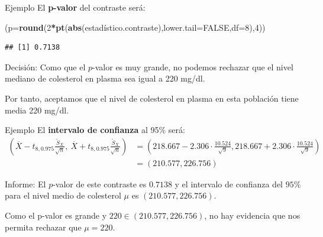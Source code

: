 \documentclass[
  ignorenonframetext,
]{beamer}
\newenvironment{Shaded}{\begin{snugshade}}{\end{snugshade}}
\newcommand{\DataTypeTok}[1]{\textcolor[rgb]{0.13,0.29,0.53}{#1}}
\newcommand{\DecValTok}[1]{\textcolor[rgb]{0.00,0.00,0.81}{#1}}
\newcommand{\KeywordTok}[1]{\textcolor[rgb]{0.13,0.29,0.53}{\textbf{#1}}}
\newcommand{\NormalTok}[1]{#1}
\newcommand{\OperatorTok}[1]{\textcolor[rgb]{0.81,0.36,0.00}{\textbf{#1}}}
\newcommand{\OtherTok}[1]{\textcolor[rgb]{0.56,0.35,0.01}{#1}}
\begin{document}
\begin{frame}[fragile]{Ejemplo}
\protect\hypertarget{ejemplo-12}{}
El \textbf{p-valor} del contraste será:

\begin{Shaded}
\begin{Highlighting}[]
\NormalTok{(}\DataTypeTok{p=}\KeywordTok{round}\NormalTok{(}\DecValTok{2}\OperatorTok{*}\KeywordTok{pt}\NormalTok{(}\KeywordTok{abs}\NormalTok{(estadístico.contraste),}\DataTypeTok{lower.tail=}\OtherTok{FALSE}\NormalTok{,}\DataTypeTok{df=}\DecValTok{8}\NormalTok{),}\DecValTok{4}\NormalTok{))}
\end{Highlighting}
\end{Shaded}

\begin{verbatim}
## [1] 0.7138
\end{verbatim}

Decisión: Como que el \(p\)-valor es muy grande, no podemos rechazar que
el nivel mediano de colesterol en plasma sea igual a 220 mg/dl.

Por tanto, aceptamos que el nivel de colesterol en plasma en esta
población tiene media 220 mg/dl.
\end{frame}

\begin{frame}{Ejemplo}
\protect\hypertarget{ejemplo-13}{}
El \textbf{intervalo de confianza} al 95\% será: \[
\begin{array}{rl}
\left(\overline{X}-t_{8,0.975}\frac{\widetilde{S}_X}{\sqrt{n}},\ \overline{X}+t_{8,0.975}\frac{\widetilde{S}_X}{\sqrt{n}}\right) & =\left(218.667-2.306\cdot \frac{10.524}{\sqrt{9}},218.667+2.306\cdot \frac{10.524}{\sqrt{9}}\right)\\ & =(210.577,226.756)
\end{array}
\]

Informe: El \(p\)-valor de este contraste es \(0.7138\) y el intervalo
de confianza del \(95\%\) para el nivel medio de colesterol \(\mu\) es
\((210.577,226.756)\).

Como el p-valor es grande y \(220\in (210.577,226.756)\), no hay
evidencia que nos permita rechazar que \(\mu=220\).
\end{frame}
\end{document}
